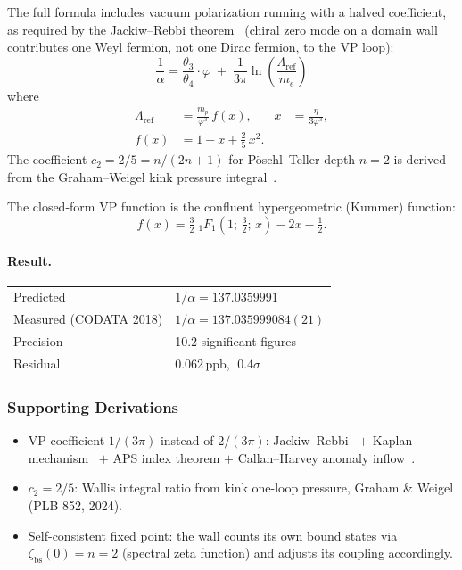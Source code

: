 \documentclass[11pt,a4paper]{article}
\newcommand{\vp}{\varphi}
\newcommand{\me}{m_e}
\newcommand{\mpr}{m_p}
\begin{document}
The full formula includes vacuum polarization running with a halved coefficient,
as required by the Jackiw--Rebbi theorem~\cite{JackiwRebbi1976}
(chiral zero mode on a domain wall contributes one Weyl fermion,
not one Dirac fermion, to the VP loop):
\begin{equation}
  \boxed{
  \frac{1}{\alpha} = \frac{\theta_3}{\theta_4}\cdot\vp
  \;+\; \frac{1}{3\pi}\ln\!\left(\frac{\Lambda_{\mathrm{ref}}}{\me}\right)
  }
\end{equation}
where
\begin{align}
  \Lambda_{\mathrm{ref}} &= \frac{\mpr}{\vp^3}\,f(x), &
  x &= \frac{\eta}{3\vp^3}, \\[6pt]
  f(x) &= 1 - x + \tfrac{2}{5}\,x^2.
\end{align}
The coefficient $c_2 = 2/5 = n/(2n+1)$ for P\"oschl--Teller depth $n = 2$ is
derived from the Graham--Weigel kink pressure integral~\cite{GrahamWeigel2024}.

The closed-form VP function is the confluent hypergeometric (Kummer) function:
\begin{equation}
  f(x) = \tfrac{3}{2}\;{}_1F_1(1;\,\tfrac{3}{2};\,x) - 2x - \tfrac{1}{2}.
\end{equation}

\paragraph{Result.}
\begin{center}
\begin{tabular}{ll}
\toprule
Predicted & $1/\alpha = 137.0359991$ \\
Measured (CODATA 2018) & $1/\alpha = 137.035999084(21)$ \\
\midrule
Precision & 10.2 significant figures \\
Residual & 0.062\,ppb, $\;0.4\sigma$ \\
\bottomrule
\end{tabular}
\end{center}

\subsubsection{Supporting Derivations}

\begin{itemize}[nosep]
\item VP coefficient $1/(3\pi)$ instead of $2/(3\pi)$:
      Jackiw--Rebbi~\cite{JackiwRebbi1976} $+$ Kaplan mechanism~\cite{Kaplan1992}
      $+$ APS index theorem $+$ Callan--Harvey anomaly inflow~\cite{CallanHarvey1985}.
\item $c_2 = 2/5$: Wallis integral ratio from kink one-loop pressure,
      Graham \& Weigel (PLB 852, 2024).
\item Self-consistent fixed point: the wall counts its own bound states via
      $\zeta_{\mathrm{bs}}(0) = n = 2$ (spectral zeta function) and adjusts
      its coupling accordingly.
\end{itemize}
\end{document}
